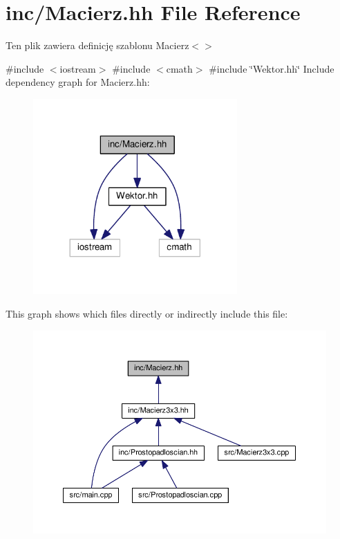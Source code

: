 \hypertarget{Macierz_8hh}{}\section{inc/\+Macierz.hh File Reference}
\label{Macierz_8hh}


Ten plik zawiera definicję szablonu Macierz$<$$>$  


{\ttfamily \#include $<$iostream$>$}\newline
{\ttfamily \#include $<$cmath$>$}\newline
{\ttfamily \#include \char`\"{}Wektor.\+hh\char`\"{}}\newline
Include dependency graph for Macierz.\+hh\+:\nopagebreak
\begin{figure}[H]
\begin{center}
\leavevmode
\includegraphics[width=221pt]{Macierz_8hh__incl}
\end{center}
\end{figure}
This graph shows which files directly or indirectly include this file\+:\nopagebreak
\begin{figure}[H]
\begin{center}
\leavevmode
\includegraphics[width=350pt]{Macierz_8hh__dep__incl}
\end{center}
\end{figure}
